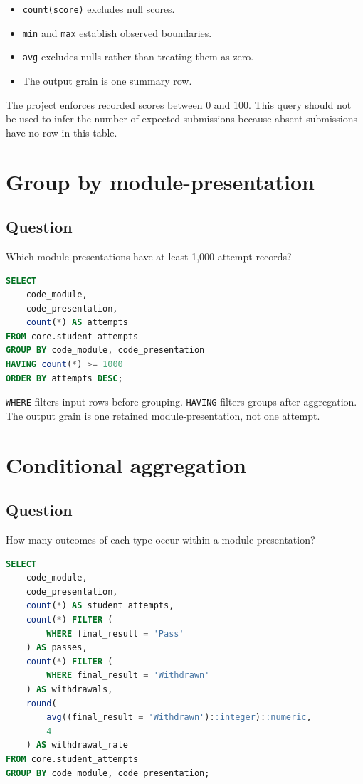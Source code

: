 \begin{itemize}
  \item \texttt{count(score)} excludes null scores.
  \item \texttt{min} and \texttt{max} establish observed boundaries.
  \item \texttt{avg} excludes nulls rather than treating them as zero.
  \item The output grain is one summary row.
\end{itemize}

The project enforces recorded scores between 0 and 100. This query should not be
used to infer the number of expected submissions because absent submissions
have no row in this table.

\section{Group by module-presentation}

\subsection{Question}
Which module-presentations have at least 1,000 attempt records?

\begin{lstlisting}[language=SQL]
SELECT
    code_module,
    code_presentation,
    count(*) AS attempts
FROM core.student_attempts
GROUP BY code_module, code_presentation
HAVING count(*) >= 1000
ORDER BY attempts DESC;
\end{lstlisting}

\texttt{WHERE} filters input rows before grouping. \texttt{HAVING} filters
groups after aggregation. The output grain is one retained
module-presentation, not one attempt.

\section{Conditional aggregation}

\subsection{Question}
How many outcomes of each type occur within a module-presentation?

\begin{lstlisting}[language=SQL,caption={Selected production pattern from
\texttt{analytics.course\_outcome\_summary}.}]
SELECT
    code_module,
    code_presentation,
    count(*) AS student_attempts,
    count(*) FILTER (
        WHERE final_result = 'Pass'
    ) AS passes,
    count(*) FILTER (
        WHERE final_result = 'Withdrawn'
    ) AS withdrawals,
    round(
        avg((final_result = 'Withdrawn')::integer)::numeric,
        4
    ) AS withdrawal_rate
FROM core.student_attempts
GROUP BY code_module, code_presentation;
\end{lstlisting}

